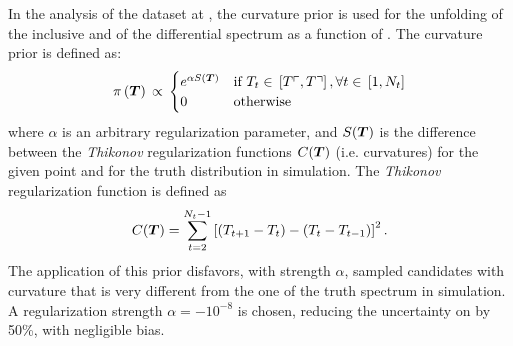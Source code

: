 In the analysis of the dataset at \seventev{}, the curvature prior is
used for the unfolding of the inclusive \ac{} and of the
differential \ac{} spectrum as a function of \pttt{}.
The curvature prior is defined as:
\begin{equation}
\pi{}\left(\boldsymbol{T}{}\right){}
\propto{}
\begin{cases}
e^{\alpha{}S(\boldsymbol{T}{})} & \text{if }
T_{t}\in{}\left[T\ulcorner{}{}, T\urcorner{}{}\right], \forall{}t\in{}\left[1, N_t\right] \\
0 & \text{otherwise} \\
\end{cases}
\end{equation}
where $\alpha{}$ is an arbitrary regularization parameter, and
$S(\boldsymbol{T}{})$ is the difference between the
\emph{Thikonov} regularization functions $C(\boldsymbol{T})$ (i.e. curvatures)
for the given point \Truth{} and for the truth distribution in simulation.
The \emph{Thikonov} regularization function is defined as
\begin{equation}
        C(\boldsymbol{T}{}) =
        \sum_{t=2}^{N_t-1}\left[(T_{t+1}-T_{t})-(T_t-T_{t-1})\right]^2.
\end{equation}
The application of this prior disfavors, with strength $\alpha{}$,
sampled \Truth{} candidates with curvature that is very different from
the one of the truth spectrum in simulation.
A regularization strength $\alpha{}=-10^{-8}$ is chosen, reducing the
uncertainty on \ac{} by 50\%, with negligible bias.

